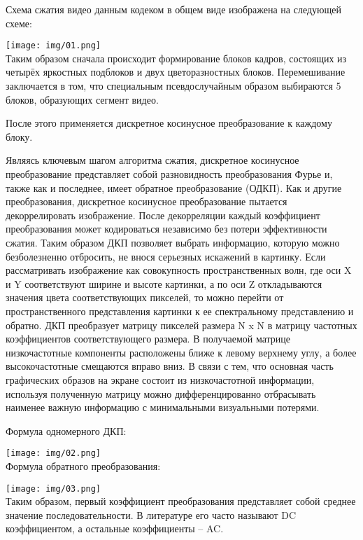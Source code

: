 Схема сжатия видео данным кодеком в общем виде изображена на следующей схеме:

\texttt{[image: img/01.png]}\\

Таким образом сначала происходит формирование блоков кадров,  состоящих из четырёх яркостных подблоков и двух цветоразностных блоков. Перемешивание заключается в том, что специальным псевдослучайным образом выбираются 5 блоков, образующих сегмент видео.

После этого применяется дискретное косинусное преобразование к каждому блоку.

Являясь ключевым шагом алгоритма сжатия, дискретное косинусное преобразование представляет собой разновидность преобразования Фурье и, также как и последнее, имеет обратное преобразование (ОДКП). Как и другие преобразования, дискретное косинусное преобразование пытается декоррелировать изображение. После декорреляции каждый коэффициент преобразования может кодироваться независимо без потери эффективности сжатия. Таким образом ДКП позволяет выбрать информацию, которую можно безболезненно отбросить, не внося серьезных искажений в картинку. Если рассматривать изображение как совокупность пространственных волн, где оси X и Y соответствуют ширине и высоте картинки, а по оси Z откладываются значения цвета соответствующих пикселей, то можно перейти от пространственного представления картинки к ее спектральному представлению и обратно. ДКП преобразует матрицу пикселей размера N x N в матрицу частотных коэффициентов соответствующего размера. В получаемой матрице низкочастотные компоненты расположены ближе к левому верхнему углу, а более высокочастотные смещаются вправо вниз. В связи с тем, что основная часть графических образов на экране состоит из низкочастотной информации, используя полученную матрицу можно дифференцированно отбрасывать наименее важную информацию с минимальными визуальными потерями.

Формула одномерного ДКП:

\texttt{[image: img/02.png]}\\

Формула обратного преобразования:

\texttt{[image: img/03.png]}\\

Таким образом, первый коэффициент преобразования представляет собой среднее значение последовательности. В литературе его часто называют DC коэффициентом, а остальные коэффициенты – AC.

